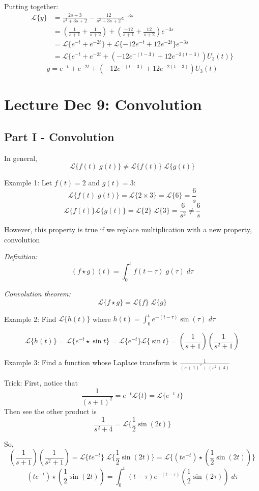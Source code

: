 \documentclass[12pt]{article}
\renewcommand{\L}[1]{\mathcal{L}\{#1\}}
\begin{document}
Putting together:
\begin{align*}
    \L{y} &= \frac{2s + 3}{s^2 + 3s +2} - \frac{12}{s^2 + 3s +2}e^{-3s}\\
    &= \left(\frac{1}{s + 1} + \frac{1}{s + 2}\right) + \left(\frac{-12}{s + 1} + \frac{12}{s + 2}\right)e^{-3s}\\
    &= \L{e^{-t} + e^{-2t}} + \L{-12e^{-t} + 12e^{-2t}}e^{-3s}\\
    &= \L{e^{-t} + e^{-2t} + (-12e^{-(t-3)} + 12e^{-2(t-3)})U_3(t)}
\end{align*}
\[\boxed{y= e^{-t} + e^{-2t} + (-12e^{-(t-3)} + 12e^{-2(t-3)})U_3(t)}\]

\section{Lecture Dec 9: Convolution}
\subsection*{Part I - Convolution}
In general,
\[\L{f(t) \; g(t)} \neq \L{f(t)} \; \L{g(t)}\]

Example 1: Let $f(t) = 2$ and $g(t) = 3$:
\[\L{f(t)\; g(t)} = \L{2 \times 3} = \L{6} = \frac{6}{s}\]
\[\L{f(t)}\L{g(t)} = \L{2}\; \L{3} = \boxed{\frac{6}{s^2} \neq \frac{6}{s}}\]

However, this property is true if we replace multiplication with a new property, convolution

\emph{Definition:}
\[(f \star g)(t) = \int_0^t f(t-\tau) \; g(\tau) \; d\tau\]

\emph{Convolution theorem:}
\[\L{f \star g} = \L{f} \; \L{g}\] 

Example 2: Find $\L{h(t)}$ where $h(t) = \int_0^t e^{-(t - \tau)} \sin(\tau)\; d\tau$

\[\L{h(t)} = \L{e^{-t} \star \sin t} = \L{e^{-t}} \L{\sin t} = \boxed{\left(\frac{1}{s + 1}\right) \left(\frac{1}{s^2 + 1}\right)}\]

Example 3: Find a function whose Laplace transform is $\frac{1}{(s+1)^2 + (s^2 + 4)}$

Trick: First, notice that 
\[\frac{1}{(s+1)^2} = e^{-t} \L{t} = \L{e^{-t} \; t}\]
Then see the other product is 
\[\frac{1}{s^2 +4} = \L{\frac{1}{2}\sin(2t)}\]

So, 
\[\left(\frac{1}{s + 1}\right) \left(\frac{1}{s^2 + 1}\right) = \L{te^{-t}} \; \L{\frac{1}{2}\sin(2t)} = \L{(te^{-t}) \star \left(\frac{1}{2}\sin(2t)\right)}\]
\[(te^{-t}) \star \left(\frac{1}{2}\sin(2t)\right) = \boxed{\int_0^t (t - \tau)e^{-(t - \tau)} \left(\frac{1}{2}\sin(2\tau)\right)\; d\tau}\]
\end{document}
